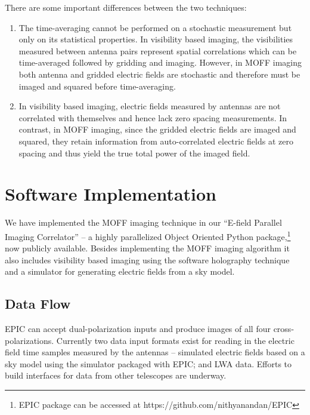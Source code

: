 \documentclass[a4paper,fleqn,usenatbib]{mnras}
\begin{document}
There are some important differences between the two techniques:
\begin{enumerate}
\item The time-averaging cannot be performed on a stochastic measurement but
  only on its statistical properties. In visibility based imaging, the 
  visibilities measured between antenna pairs represent spatial correlations 
  which can be time-averaged followed by gridding and imaging. However, in MOFF 
  imaging both antenna and gridded electric fields are stochastic and therefore 
  must be imaged and squared before time-averaging. 
\item In visibility based imaging, electric fields measured by antennas are not 
  correlated with themselves and hence lack zero spacing measurements. In 
  contrast, in MOFF imaging, since the gridded electric fields are imaged and 
  squared, they retain information from auto-correlated electric fields at zero 
  spacing and thus yield the true total power of the imaged field.
\end{enumerate} 

\section{Software Implementation}\label{sec:software}

We have implemented the MOFF imaging technique in our ``E-field Parallel Imaging
Correlator'' -- a highly parallelized Object Oriented Python 
package,\footnote{EPIC package can be accessed at https://github.com/nithyanandan/EPIC}
now publicly available. Besides implementing the MOFF imaging algorithm it also
includes visibility based imaging using the software holography technique and a 
simulator for generating electric fields from a sky model. 

\subsection{Data Flow}

EPIC can accept dual-polarization inputs and produce images of all four 
cross-polarizations. Currently two data input formats exist for reading in the 
electric field time samples measured by the antennas -- simulated electric 
fields based on a sky model using the simulator packaged with EPIC; and LWA 
data. Efforts to build interfaces for data from other telescopes are underway.
\end{document}
